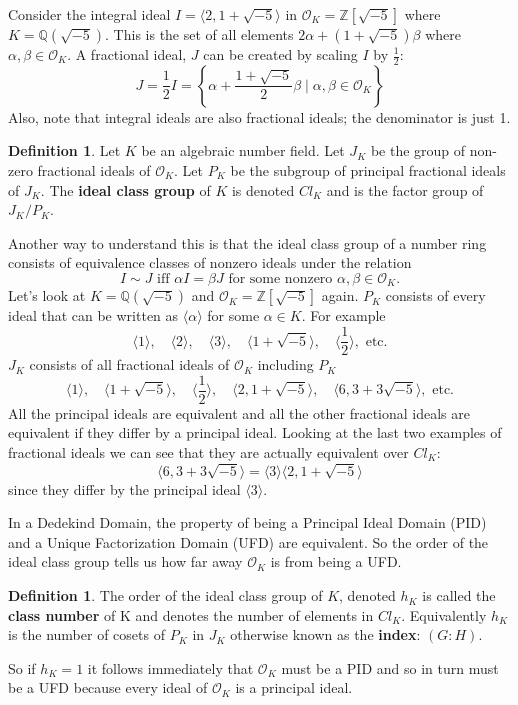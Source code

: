 \documentclass[12pt]{article}
\theoremstyle{definition}
\newtheorem{definition}[theorem]{Definition}
\begin{document}
Consider the integral ideal $I = \langle2, 1 + \sqrt{-5}\rangle$ in $\mathcal{O}_K = \mathbb{Z}[\sqrt{-5}]$ where $K=\mathbb{Q}(\sqrt{-5})$. This is the set of all elements
$2\alpha + (1 + \sqrt{-5})\beta$ where $\alpha, \beta \in \mathcal{O}_K$. A fractional ideal, $J$ can be created by scaling $I$ by $\frac{1}{2}$:
\[J = \frac{1}{2}I = \left\{ \alpha + \frac{1 + \sqrt{-5}}{2}\beta \mid \alpha, \beta \in \mathcal{O}_K \right\}\]
Also, note that integral ideals are also fractional ideals; the denominator is just 1.

\begin{definition}
    Let $K$ be an algebraic number field. Let $J_K$ be the group of non-zero fractional ideals of $\mathcal{O}_K$.
    Let $P_K$ be the subgroup of principal fractional ideals of $J_K$. The \textbf{ideal class group} of $K$ is denoted $Cl_K$ and is the factor group of $J_K/P_K$.
\end{definition}
Another way to understand this is that the ideal class group of a number ring consists of equivalence classes of nonzero ideals under the relation
\[I \sim J \text{ iff } {\alpha}I={\beta}J \text{ for some nonzero } \alpha, \beta \in \mathcal{O}_K.\]
Let's look at $K=\mathbb{Q}(\sqrt{-5})$ and $\mathcal{O}_K = \mathbb{Z}[\sqrt{-5}]$ again. $P_K$ consists of every
ideal that can be written as $\langle \alpha \rangle$ for some $\alpha \in K$. For example
\[\langle 1 \rangle, \quad \langle 2 \rangle, \quad \langle 3 \rangle, \quad \langle 1+\sqrt{-5} \rangle, \quad \langle \frac{1}{2} \rangle, \text{ etc.}\]
$J_K$ consists of all fractional ideals of $\mathcal{O}_K$ including $P_K$
\[\langle 1 \rangle, \quad \langle 1+\sqrt{-5} \rangle, \quad \langle \frac{1}{2} \rangle, \quad \langle 2, 1+\sqrt{-5} \rangle, \quad \langle 6, 3+3\sqrt{-5} \rangle, \text{ etc.}\]
All the principal ideals are equivalent and all the other fractional ideals are equivalent if they differ by a principal ideal.
Looking at the last two examples of fractional ideals we can see that they are actually equivalent over $Cl_K$:
\[\langle 6, 3+3\sqrt{-5} \rangle = \langle 3 \rangle\langle 2, 1+\sqrt{-5} \rangle\]
since they differ by the principal ideal $\langle 3 \rangle$. 

In a Dedekind Domain, the property of being a Principal Ideal Domain (PID) and a Unique Factorization Domain (UFD) are equivalent. So the order
of the ideal class group tells us how far away $\mathcal{O}_K$ is from being a UFD. 
\begin{definition}
    The order of the ideal class group of $K$, denoted $h_K$ is called the \textbf{class number} of K and denotes the number of elements
    in $Cl_K$. Equivalently $h_K$ is the number of cosets of $P_K$ in $J_K$ otherwise known as the \textbf{index}: $(G:H)$.
\end{definition}
So if $h_K = 1$ it follows immediately that $\mathcal{O}_K$ must be a PID and so in turn must be a UFD because every ideal of $\mathcal{O}_K$ is a principal ideal. 
\end{document}
